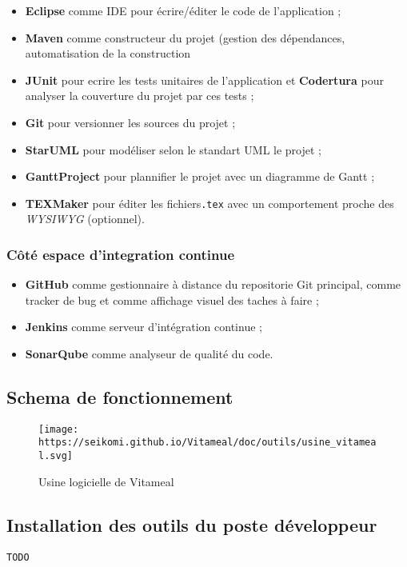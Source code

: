 \begin{itemize}
\tightlist
\item
  \textbf{Eclipse} comme IDE pour écrire/éditer le code de l'application
  ;
\item
  \textbf{Maven} comme constructeur du projet (gestion des dépendances,
  automatisation de la construction
\item
  \textbf{JUnit} pour ecrire les tests unitaires de l'application et
  \textbf{Codertura} pour analyser la couverture du projet par ces tests
  ;
\item
  \textbf{Git} pour versionner les sources du projet ;
\item
  \textbf{StarUML} pour modéliser selon le standart UML le projet ;
\item
  \textbf{GanttProject} pour plannifier le projet avec un diagramme de
  Gantt ;
\item
  \textbf{TEXMaker} pour éditer les fichiers\texttt{.tex} avec un
  comportement proche des \emph{WYSIWYG} (optionnel).
\end{itemize}

\subsubsection{Côté espace d'integration
continue}\label{cuxf4tuxe9-espace-dintegration-continue}

\begin{itemize}
\tightlist
\item
  \textbf{GitHub} comme gestionnaire à distance du repositorie Git
  principal, comme tracker de bug et comme affichage visuel des taches à
  faire ;
\item
  \textbf{Jenkins} comme serveur d'intégration continue ;
\item
  \textbf{SonarQube} comme analyseur de qualité du code.
\end{itemize}

\subsection{Schema de fonctionnement}\label{schema-de-fonctionnement}

\begin{figure}
\centering
\texttt{[image: https://seikomi.github.io/Vitameal/doc/outils/usine\_vitameal.svg]}
\caption{Usine logicielle de Vitameal}
\end{figure}

\subsection{Installation des outils du poste
développeur}\label{installation-des-outils-du-poste-duxe9veloppeur}

\texttt{TODO}
